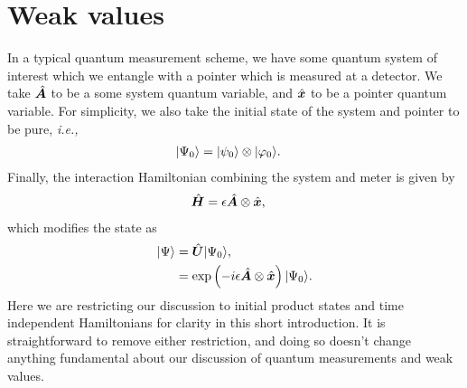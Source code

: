 \section{Weak values}
In a typical quantum measurement scheme, we have some quantum system of interest which we entangle with a pointer which is measured at a detector.  We take $\hat{\bm A}$ to be a some system quantum variable, and $\hat{\bm x}$ to be a pointer quantum variable.  For simplicity, we also take the initial state of the system and pointer to be pure, \emph{i.e.,}
\begin{align}
  \lvert \Psi_0\rangle &= \lvert \psi_0\rangle \otimes \lvert \varphi_0\rangle.
\end{align}
Finally, the interaction Hamiltonian combining the system and meter is given by
\begin{align}
  \hat{\bm H} &= \epsilon \hat{\bm A} \otimes \hat{\bm x},
\end{align}
which modifies the state as
\begin{align}
\nonumber  \lvert \Psi\rangle &= \hat{\bm U}\lvert \Psi_0\rangle, \\
                      &= \exp\left(-i\epsilon \hat{\bm A} \otimes \hat{\bm x} \right) \lvert \Psi_0\rangle.
\end{align}
Here we are restricting our discussion to initial product states and time independent Hamiltonians for clarity in this short introduction.  It is straightforward to remove either restriction, and doing so doesn't change anything fundamental about our discussion of quantum measurements and weak values.

